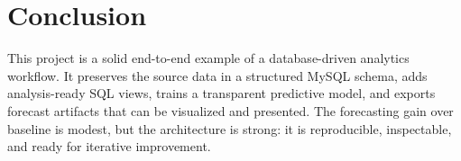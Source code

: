 \documentclass[conference]{IEEEtran}
\begin{document}
\section{Conclusion}

This project is a solid end-to-end example of a database-driven analytics workflow. It preserves the source data in a structured MySQL schema, adds analysis-ready SQL views, trains a transparent predictive model, and exports forecast artifacts that can be visualized and presented. The forecasting gain over baseline is modest, but the architecture is strong: it is reproducible, inspectable, and ready for iterative improvement.
\end{document}
